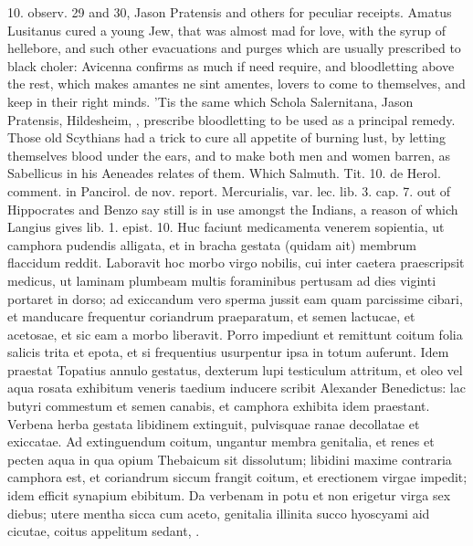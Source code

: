 10. observ. 29 and 30, Jason Pratensis and others for peculiar
receipts. Amatus Lusitanus cured a young Jew, that was almost mad
for love, with the syrup of hellebore, and such other evacuations and
purges which are usually prescribed to black choler: Avicenna
confirms as much if need require, and bloodletting above the
rest, which makes amantes ne sint amentes, lovers to come to
themselves, and keep in their right minds. 'Tis the same which Schola
Salernitana, Jason Pratensis, Hildesheim, \etc{}, prescribe bloodletting
to be used as a principal remedy. Those old Scythians had a trick to
cure all appetite of burning lust, by  letting themselves blood
under the ears, and to make both men and women barren, as Sabellicus in
his Aeneades relates of them. Which Salmuth. Tit. 10. de Herol.
comment. in Pancirol. de nov. report. Mercurialis, var. lec. lib. 3.
cap. 7. out of Hippocrates and Benzo say still is in use amongst the
Indians, a reason of which Langius gives lib. 1. epist. 10.
Huc faciunt medicamenta venerem sopientia, ut camphora pudendis
alligata, et in bracha gestata (quidam ait) membrum flaccidum reddit.
Laboravit hoc morbo virgo nobilis, cui inter caetera praescripsit
medicus, ut laminam plumbeam multis foraminibus pertusam ad dies
viginti portaret in dorso; ad exiccandum vero sperma jussit eam quam
parcissime cibari, et manducare frequentur coriandrum praeparatum, et
semen lactucae, et acetosae, et sic eam a morbo liberavit. Porro
impediunt et remittunt coitum folia salicis trita et epota, et si
frequentius usurpentur ipsa in totum auferunt. Idem praestat Topatius
annulo gestatus, dexterum lupi testiculum attritum, et oleo vel aqua
rosata exhibitum veneris taedium inducere scribit Alexander Benedictus:
lac butyri commestum et semen canabis, et camphora exhibita idem
praestant. Verbena herba gestata libidinem extinguit, pulvisquae ranae
decollatae et exiccatae. Ad extinguendum coitum, ungantur membra
genitalia, et renes et pecten aqua in qua opium Thebaicum sit
dissolutum; libidini maxime contraria camphora est, et coriandrum
siccum frangit coitum, et erectionem virgae impedit; idem efficit
synapium ebibitum. Da verbenam in potu et non erigetur virga sex
diebus; utere mentha sicca cum aceto, genitalia illinita succo
hyoscyami aid cicutae, coitus appelitum sedant, \etc{}.


